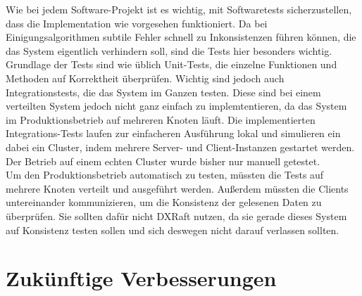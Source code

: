 Wie bei jedem Software-Projekt ist es wichtig, mit Softwaretests sicherzustellen, dass die Implementation wie vorgesehen funktioniert. Da bei Einigungsalgorithmen subtile Fehler schnell zu Inkonsistenzen führen können, die das System eigentlich verhindern soll, sind die Tests hier besonders wichtig. Grundlage der Tests sind wie üblich Unit-Tests, die einzelne Funktionen und Methoden auf Korrektheit überprüfen. Wichtig sind jedoch auch Integrationstests, die das System im Ganzen testen. Diese sind bei einem verteilten System jedoch nicht ganz einfach zu implemtentieren, da das System im Produktionsbetrieb auf mehreren Knoten läuft. Die implementierten Integrations-Tests laufen zur einfacheren Ausführung lokal und simulieren ein dabei ein Cluster, indem mehrere Server- und Client-Instanzen gestartet werden. Der Betrieb auf einem echten Cluster wurde bisher nur manuell getestet. \\
Um den Produktionsbetrieb automatisch zu testen, müssten die Tests auf mehrere Knoten verteilt und ausgeführt werden. Außerdem müssten die Clients untereinander kommunizieren, um die Konsistenz der gelesenen Daten zu überprüfen. Sie sollten dafür nicht DXRaft nutzen, da sie gerade dieses System auf Konsistenz testen sollen und sich deswegen nicht darauf verlassen sollten. \\

\section{Zukünftige Verbesserungen}